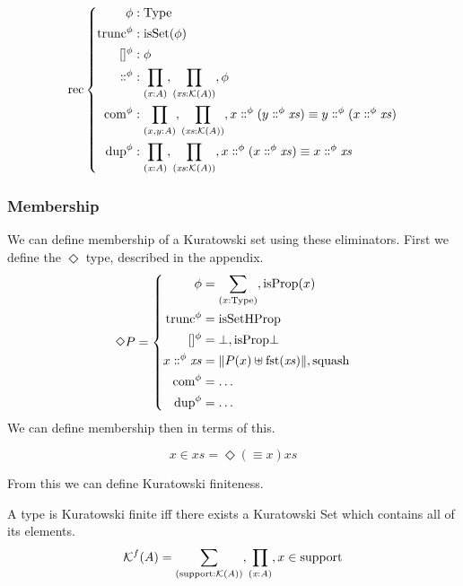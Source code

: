 \begin{refsection}
\begin{equation} \label{kuratowski-rec}
  \text{rec} \left\{ \begin{aligned}
    \phi &: \text{Type} \\
    \text{trunc}^\phi &: \text{isSet}(\phi) \\
    []^\phi &: \phi \\
    \dblcolon^\phi &: \pifun{x}{A} , \pifun{xs}{\mathcal{K}(A)} , \phi \\
    \text{com}^\phi &: \prod_{(x , y : A)} , \pifun{xs}{\mathcal{K}(A)} , x \dblcolon^\phi (y \dblcolon^\phi \mathit{xs}) \equiv y \dblcolon^\phi (x \dblcolon^\phi \mathit{xs}) \\
    \text{dup}^\phi &: \pifun{x}{A} , \pifun{xs}{\mathcal{K}(A)} , x \dblcolon^\phi (x \dblcolon^\phi \mathit{xs}) \equiv x \dblcolon^\phi \mathit{xs}
  \end{aligned} \right.
\end{equation}


\subsubsection{Membership}
We can define membership of a Kuratowski set using these eliminators.
First we define the \(\Diamond\) type, described in the appendix.
\begin{equation}
  \Diamond P = \left\{ \begin{aligned}
    \phi &= \sum_{(x : \text{Type})} , \text{isProp}(x) \\
    \text{trunc}^\phi &= \text{isSetHProp} \\
    []^\phi &= \bot , \text{isProp}\bot \\
    x \dblcolon^\phi \mathit{xs} &= \lVert P(x) \uplus \text{fst}(\mathit{xs}) \rVert , \text{squash} \\
    \text{com}^\phi &= \dots \\
    \text{dup}^\phi &= \dots
  \end{aligned} \right.
\end{equation}
We can define membership then in terms of this.
\begin{definition}
  \begin{equation}
    x \in \mathit{xs} = \Diamond (\equiv x) \mathit{xs}
  \end{equation}
\end{definition}

From this we can define Kuratowski finiteness.
\begin{definition}
  A type is Kuratowski finite iff there exists a Kuratowski Set which contains
  all of its elements.
  \begin{equation}
    \mathcal{K}^{f}(A) = \sum_{(\text{support} : \mathcal{K}(A))} , \prod_{\left( \mathit{ x } : A \right)} , x \in \text{support}
  \end{equation}
\end{definition}


\end{refsection}
